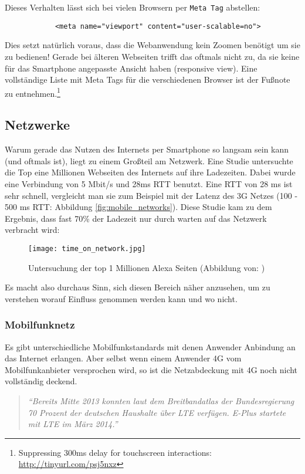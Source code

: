 		Dieses Verhalten lässt sich bei vielen Browsern per \texttt{Meta Tag} abstellen:

		\begin{lstlisting}
			<meta name="viewport" content="user-scalable=no">
		\end{lstlisting}

		Dies setzt natürlich voraus, dass die Webanwendung kein Zoomen benötigt um sie zu bedienen! Gerade bei älteren Webseiten trifft das oftmals nicht zu, da sie keine für das Smartphone angepasste Ansicht haben (responsive view). Eine vollständige Liste mit Meta Tags für die verschiedenen Browser ist der Fußnote zu entnehmen.\footnote{Suppressing 300ms delay for touchscreen interactions: \url{http://tinyurl.com/psj5nxz}}


	\subsection{Netzwerke} %
	\label{sub:netzwerke}
		Warum gerade das Nutzen des Internets per Smartphone so langsam sein kann (und oftmals ist), liegt zu einem Großteil am Netzwerk. Eine Studie untersuchte die Top eine Millionen Webseiten des Internets auf ihre Ladezeiten. Dabei wurde eine Verbindung von 5 Mbit/s und 28ms RTT benutzt. Eine RTT von 28 ms ist sehr schnell, vergleicht man sie zum Beispiel mit der Latenz des 3G Netzes (100 - 500 ms RTT: Abbildung \ref{fig:mobile_networks}). Diese Studie kam zu dem Ergebnis, dass fast 70\% der Ladezeit nur durch warten auf das Netzwerk verbracht wird:

		\begin{figure}[htbp]
			\begin{center}
				\texttt{[image: time\_on\_network.jpg]}
				\caption{Untersuchung der top 1 Millionen Alexa Seiten (Abbildung von: \autocite{alexa})}
				\label{fig:time_on_network}
			\end{center}
		\end{figure}

		Es macht also durchaus Sinn, sich diesen Bereich näher anzusehen, um zu verstehen worauf Einfluss genommen werden kann und wo nicht.

		\subsubsection{Mobilfunknetz} %
		\label{ssub:Mobilfunknetz}
			Es gibt unterschiedliche Mobilfunkstandards mit denen Anwender Anbindung an das Internet erlangen. Aber selbst wenn einem Anwender 4G vom Mobilfunkanbieter versprochen wird, so ist die Netzabdeckung mit 4G noch nicht vollständig deckend.
			\begin{quote}
				\textit{"`Bereits Mitte 2013 konnten laut dem Breitbandatlas der Bundesregierung 70 Prozent der deutschen Haushalte über LTE verfügen. E-Plus startete mit LTE im März 2014."' \autocite{netzagentur}}
			\end{quote}

